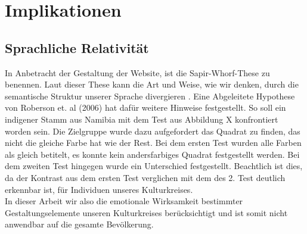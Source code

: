 \documentclass[./dokumentation.tex]{subfiles}
\begin{document}
\section{Implikationen}
\subsection{Sprachliche Relativität}
In Anbetracht der Gestaltung der Website, ist die Sapir-Whorf-These zu benennen. Laut dieser These kann die Art und Weise, wie wir denken, durch die semantische Struktur unserer Sprache divergieren \cite{Cibelli2016}. Eine Abgeleitete Hypothese von Roberson et. al (2006) hat dafür weitere Hinweise festgestellt. So soll ein indigener Stamm aus Namibia mit dem Test aus Abbildung X konfrontiert worden sein. Die Zielgruppe wurde dazu aufgefordert das Quadrat zu finden, das nicht die gleiche Farbe hat wie der Rest. Bei dem ersten Test wurden alle Farben als gleich betitelt, es konnte kein andersfarbiges Quadrat festgestellt werden. Bei dem zweiten Test hingegen wurde ein Unterschied festgestellt. Beachtlich ist dies, da der Kontrast aus dem ersten Test verglichen mit dem des 2. Test deutlich erkennbar  ist, für Individuen unseres Kulturkreises.\\
In dieser Arbeit wir also die emotionale Wirksamkeit bestimmter Gestaltungselemente unseren Kulturkreises berücksichtigt und ist somit nicht anwendbar auf die gesamte Bevölkerung. 
\end{document}
